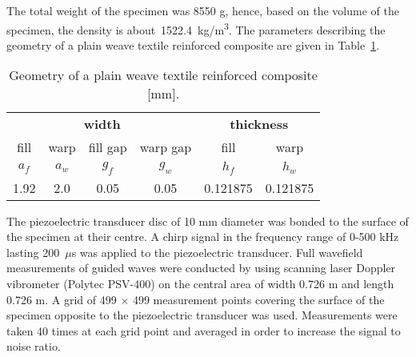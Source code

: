 The total weight of the specimen was 8550 g, hence, based on the volume of the specimen, the density is about~1522.4~kg/m\textsuperscript{3}.
The parameters describing the geometry of a plain weave textile reinforced composite are given in Table~\ref{tab:weave_geo}. 
 
\begin{table}[h]
\caption{Geometry of a plain weave textile reinforced composite [mm].}

	\renewcommand{\arraystretch}{1.3}
	\centering \footnotesize
	
		\begin{tabular}{cccccc} 
				\toprule
		\multicolumn{4}{c}{\textbf{width} }	& \multicolumn{2}{c}{\textbf{thickness} }  \\ 
			    \cmidrule(lr){1-4} \cmidrule(lr){5-6} 
		fill & warp & fill gap& warp gap& fill & warp\\
				\(a_f\) &\(a_w\)& \(g_f\)  & \(g_w\)  & \(h_f\)& \(h_w\) \\ 
						\cmidrule(lr){1-2} \cmidrule(lr){3-4} \cmidrule(lr){5-6}
		1.92 &2.0& 0.05& 0.05 & 0.121875 & 0.121875 \\
				\bottomrule 
	\end{tabular} 
	\label{tab:weave_geo}

\end{table}


The piezoelectric transducer disc of 10 mm diameter  was bonded to the surface of the 
specimen at their centre. A chirp signal in the frequency range of 0-500 kHz lasting 
200~\(\mu\)s was applied to the piezoelectric transducer.  Full wavefield measurements of guided waves were conducted by using 
scanning laser Doppler vibrometer (Polytec PSV-400) on the central area of width 
0.726 m and length 0.726 m. A grid of 499 \(\times\) 499 measurement points covering 
the surface of the specimen opposite to the piezoelectric transducer was used. 
 Measurements were taken 40 times at each grid point and averaged in 
order to increase the signal to noise ratio.


